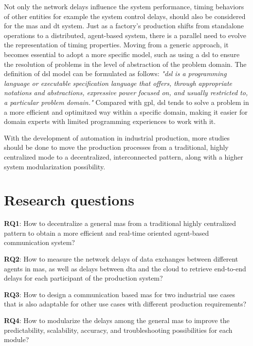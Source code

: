Not only the network delays influence the system performance, timing behaviors of other 
entities for example the system control delays, should also be considered for the \gls{mas} and 
\gls{dt} system.
Just as a factory's production shifts from standalone operations to a distributed, 
agent-based system, there is a parallel need to evolve the representation of timing 
properties. Moving from a generic approach, it becomes essential to adopt a more 
specific model, such as using a \gls{dsl} to ensure the resolution of problems 
in the level of abstraction of the problem domain. The definition of \gls{dsl} model 
can be formulated as follows: \textit{"\gls{dsl} is a programming language or executable 
specification language
that offers, through appropriate notations and abstractions, expressive power focused 
on, and usually restricted to, a particular problem domain."}\cite{van_deursen_domain-specific_2000}
Compared with \gls{gpl}, \gls{dsl} tends to solve a problem in a more efficient 
and optimitzed way within a specific domain, making it easier for domain experts 
with limited programming experiences to work with it.  

With the development of automation in industrial production, more studies 
should be done to move the production processes from a traditional, highly 
centralized mode to a decentralized, interconnected pattern, along with 
a higher system modularization possibility. 









\section{Research questions}
\textbf{RQ1}: How to decentralize a general \gls{mas} from a traditional highly 
centralized pattern to obtain a more efficient and real-time oriented agent-based 
communication system?

\textbf{RQ2}: How to measure the network delays of data exchanges between 
different agents in \gls{mas}, as well as delays between \gls{dta} and the cloud 
to retrieve end-to-end delays for each participant of the production system?

\textbf{RQ3}: How to design a communication based \gls{mas} for two industrial use 
cases that is also adaptable for other use cases with different production 
requirements? 

\textbf{RQ4}: How to modularize the delays among the general \gls{mas} to improve the 
predictability, scalability, accuracy, and troubleshooting possibilities for 
each module?  



